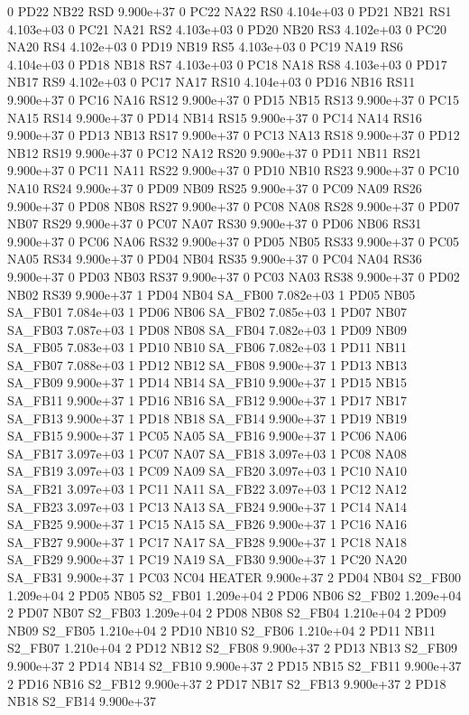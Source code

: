 0 PD22 NB22 RSD 9.900e+37 
0 PC22 NA22 RS0 4.104e+03 
0 PD21 NB21 RS1 4.103e+03 
0 PC21 NA21 RS2 4.103e+03 
0 PD20 NB20 RS3 4.102e+03 
0 PC20 NA20 RS4 4.102e+03 
0 PD19 NB19 RS5 4.103e+03 
0 PC19 NA19 RS6 4.104e+03 
0 PD18 NB18 RS7 4.103e+03 
0 PC18 NA18 RS8 4.103e+03 
0 PD17 NB17 RS9 4.102e+03 
0 PC17 NA17 RS10 4.104e+03 
0 PD16 NB16 RS11 9.900e+37 
0 PC16 NA16 RS12 9.900e+37 
0 PD15 NB15 RS13 9.900e+37 
0 PC15 NA15 RS14 9.900e+37 
0 PD14 NB14 RS15 9.900e+37 
0 PC14 NA14 RS16 9.900e+37 
0 PD13 NB13 RS17 9.900e+37 
0 PC13 NA13 RS18 9.900e+37 
0 PD12 NB12 RS19 9.900e+37 
0 PC12 NA12 RS20 9.900e+37 
0 PD11 NB11 RS21 9.900e+37 
0 PC11 NA11 RS22 9.900e+37 
0 PD10 NB10 RS23 9.900e+37 
0 PC10 NA10 RS24 9.900e+37 
0 PD09 NB09 RS25 9.900e+37 
0 PC09 NA09 RS26 9.900e+37 
0 PD08 NB08 RS27 9.900e+37 
0 PC08 NA08 RS28 9.900e+37 
0 PD07 NB07 RS29 9.900e+37 
0 PC07 NA07 RS30 9.900e+37 
0 PD06 NB06 RS31 9.900e+37 
0 PC06 NA06 RS32 9.900e+37 
0 PD05 NB05 RS33 9.900e+37 
0 PC05 NA05 RS34 9.900e+37 
0 PD04 NB04 RS35 9.900e+37 
0 PC04 NA04 RS36 9.900e+37 
0 PD03 NB03 RS37 9.900e+37 
0 PC03 NA03 RS38 9.900e+37 
0 PD02 NB02 RS39 9.900e+37 
1 PD04 NB04 SA_FB00 7.082e+03 
1 PD05 NB05 SA_FB01 7.084e+03 
1 PD06 NB06 SA_FB02 7.085e+03 
1 PD07 NB07 SA_FB03 7.087e+03 
1 PD08 NB08 SA_FB04 7.082e+03 
1 PD09 NB09 SA_FB05 7.083e+03 
1 PD10 NB10 SA_FB06 7.082e+03 
1 PD11 NB11 SA_FB07 7.088e+03 
1 PD12 NB12 SA_FB08 9.900e+37 
1 PD13 NB13 SA_FB09 9.900e+37 
1 PD14 NB14 SA_FB10 9.900e+37 
1 PD15 NB15 SA_FB11 9.900e+37 
1 PD16 NB16 SA_FB12 9.900e+37 
1 PD17 NB17 SA_FB13 9.900e+37 
1 PD18 NB18 SA_FB14 9.900e+37 
1 PD19 NB19 SA_FB15 9.900e+37 
1 PC05 NA05 SA_FB16 9.900e+37 
1 PC06 NA06 SA_FB17 3.097e+03 
1 PC07 NA07 SA_FB18 3.097e+03 
1 PC08 NA08 SA_FB19 3.097e+03 
1 PC09 NA09 SA_FB20 3.097e+03 
1 PC10 NA10 SA_FB21 3.097e+03 
1 PC11 NA11 SA_FB22 3.097e+03 
1 PC12 NA12 SA_FB23 3.097e+03 
1 PC13 NA13 SA_FB24 9.900e+37 
1 PC14 NA14 SA_FB25 9.900e+37 
1 PC15 NA15 SA_FB26 9.900e+37 
1 PC16 NA16 SA_FB27 9.900e+37 
1 PC17 NA17 SA_FB28 9.900e+37 
1 PC18 NA18 SA_FB29 9.900e+37 
1 PC19 NA19 SA_FB30 9.900e+37 
1 PC20 NA20 SA_FB31 9.900e+37 
1 PC03 NC04 HEATER 9.900e+37 
2 PD04 NB04 S2_FB00 1.209e+04 
2 PD05 NB05 S2_FB01 1.209e+04 
2 PD06 NB06 S2_FB02 1.209e+04 
2 PD07 NB07 S2_FB03 1.209e+04 
2 PD08 NB08 S2_FB04 1.210e+04 
2 PD09 NB09 S2_FB05 1.210e+04 
2 PD10 NB10 S2_FB06 1.210e+04 
2 PD11 NB11 S2_FB07 1.210e+04 
2 PD12 NB12 S2_FB08 9.900e+37 
2 PD13 NB13 S2_FB09 9.900e+37 
2 PD14 NB14 S2_FB10 9.900e+37 
2 PD15 NB15 S2_FB11 9.900e+37 
2 PD16 NB16 S2_FB12 9.900e+37 
2 PD17 NB17 S2_FB13 9.900e+37 
2 PD18 NB18 S2_FB14 9.900e+37 
